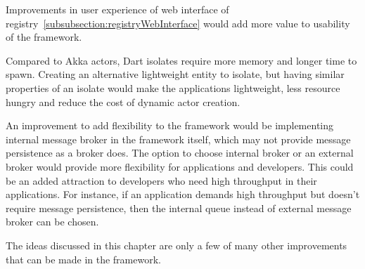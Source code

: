   Improvements in user experience of web interface of registry~\autoref{subsubsection:registryWebInterface} would add more value to usability of the framework.

  Compared to Akka actors, Dart isolates require more memory and longer time to spawn. Creating an alternative lightweight entity to isolate, but having similar properties of an isolate would make the applications lightweight, less resource hungry and reduce the cost of dynamic actor creation.

  An improvement to add flexibility to the framework would be implementing internal message broker in the framework itself, which may not provide message persistence as a broker does. The option to choose internal broker or an external broker would provide more flexibility for applications and developers. This could be an added attraction to developers who need high throughput in their applications.
  For instance, if an application demands high throughput but doesn't require message persistence, then the internal queue instead of external message broker can be chosen.

  The ideas discussed in this chapter are only a few of many other improvements that can be made in the framework.
